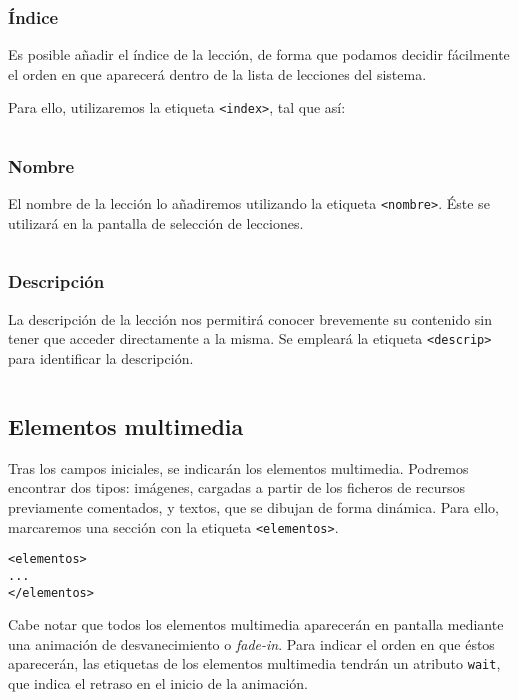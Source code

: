\subsubsection{Índice}
Es posible añadir el índice de la lección, de forma que podamos decidir
fácilmente el orden en que aparecerá dentro de la lista de lecciones del sistema.

Para ello, utilizaremos la etiqueta \texttt{<index>}, tal que así:

\inputminted{xml}{apendice_manual_lecciones/snippet_1}

\subsubsection{Nombre}
El nombre de la lección lo añadiremos utilizando la etiqueta
\texttt{<nombre>}. Éste se utilizará en la pantalla de selección de lecciones.

\inputminted{xml}{apendice_manual_lecciones/snippet_2}

\subsubsection{Descripción}

La descripción de la lección nos permitirá conocer brevemente su contenido sin
tener que acceder directamente a la misma. Se empleará la etiqueta
\texttt{<descrip>} para identificar la descripción.

\inputminted{xml}{apendice_manual_lecciones/snippet_3}

\subsection{Elementos multimedia}
Tras los campos iniciales, se indicarán los elementos multimedia. Podremos
encontrar dos tipos: imágenes, cargadas a partir de los ficheros de recursos
previamente comentados, y textos, que se dibujan de forma dinámica. Para ello,
marcaremos una sección con la etiqueta \texttt{<elementos>}.

\begin{verbatim}
<elementos>
...
</elementos>  
\end{verbatim}

Cabe notar que todos los elementos multimedia aparecerán en pantalla mediante
una animación de desvanecimiento o \textit{fade-in}. Para indicar el orden en
que éstos aparecerán, las etiquetas de los elementos multimedia tendrán un
atributo \texttt{wait}, que indica el retraso en el inicio de la animación.

